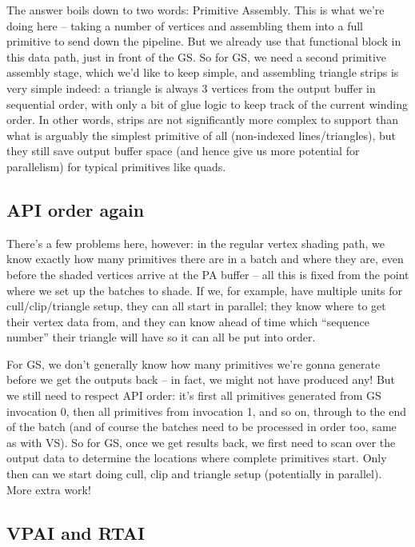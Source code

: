\documentclass[12pt]{article}
\begin{document}
The answer boils down to two words: Primitive Assembly. This is what we’re doing here – taking a number of vertices and assembling them into a full primitive to send down the pipeline. But we already use that functional block in this data path, just in front of the GS. So for GS, we need a second primitive assembly stage, which we’d like to keep simple, and assembling triangle strips is very simple indeed: a triangle is always 3 vertices from the output buffer in sequential order, with only a bit of glue logic to keep track of the current winding order. In other words, strips are not significantly more complex to support than what is arguably the simplest primitive of all (non-indexed lines/triangles), but they still save output buffer space (and hence give us more potential for parallelism) for typical primitives like quads.

\subsection{API order again}
\label{sec:orgadcf3ed}

There’s a few problems here, however: in the regular vertex shading path, we know exactly how many primitives there are in a batch and where they are, even before the shaded vertices arrive at the PA buffer – all this is fixed from the point where we set up the batches to shade. If we, for example, have multiple units for cull/clip/triangle setup, they can all start in parallel; they know where to get their vertex data from, and they can know ahead of time which “sequence number” their triangle will have so it can all be put into order.

For GS, we don’t generally know how many primitives we’re gonna generate before we get the outputs back – in fact, we might not have produced any! But we still need to respect API order: it’s first all primitives generated from GS invocation 0, then all primitives from invocation 1, and so on, through to the end of the batch (and of course the batches need to be processed in order too, same as with VS). So for GS, once we get results back, we first need to scan over the output data to determine the locations where complete primitives start. Only then can we start doing cull, clip and triangle setup (potentially in parallel). More extra work!

\subsection{VPAI and RTAI}
\label{sec:org111171d}
\end{document}
